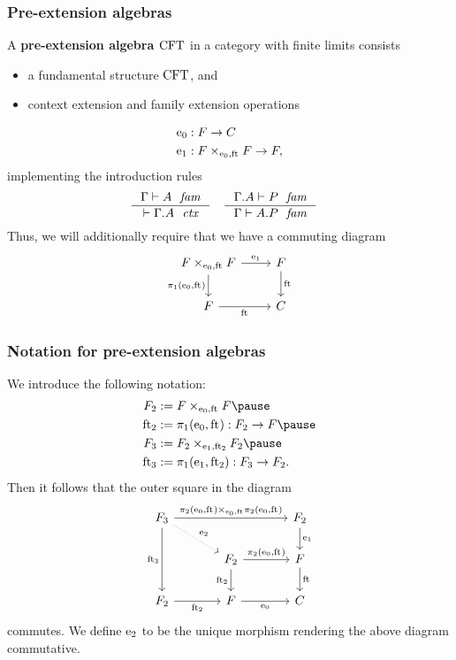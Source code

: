 \documentclass[handout]{beamer}
\newcommand\important[1]{\textbf{\color{red!90!black}#1}}
\begin{document}
\begin{frame}
\frametitle{\bf Pre-extension algebras}
A \important{pre-extension algebra $\mathrm{CFT}$} in a category with finite limits consists
\begin{itemize}
\item a fundamental structure $\mathrm{CFT}$, and
\item context extension and family extension operations
\end{itemize}
\begin{align*}
\ectxext%
  &%
: \stesysf \to \stesysc%
  \\
\efamext%
  &%
: \stesysff \to \stesysf,%
\end{align*}
implementing the introduction rules
\begin{align*}
& \inference
  { \jfam{\Gamma}{A}
    }
  { \jctx{\ctxext{\Gamma}{A}}
    }
& & \inference
  { \jfam{{\Gamma}{A}}{P}
    }
  { \jfam{\Gamma}{\ctxext{A}{P}}
    }
\end{align*}
Thus, we will additionally require that we have a commuting diagram
\begin{equation*}
\begin{tikzcd}[ampersand replacement=\&]
\stesysff 
  \ar{r}{\efamext} 
  \ar{d}[swap]{\pullbackpr{1}{\ectxext}{\eft}} 
  \& 
\stesysf 
  \ar{d}{\eft}
  \\
\stesysf
  \ar{r}[swap]{\eft} 
  \& 
\stesysc
\end{tikzcd}
\end{equation*}
\end{frame}

\begin{frame}
\frametitle{\bf Notation for pre-extension algebras}
We introduce the following notation:
\begin{align*}
\stesysf_2 
  & := \stesysff
  \pause
  \\
\eft[2] 
  & := \pullbackpr{1}{\ectxext}{\eft} : \stesysf_2\to\stesysf
  \pause
  \\
\stesysf_3 & := \pullback{\stesysf_2}{\stesysf_2}{\efamext}{\eft[2]}
  \pause
  \\
\eft[3]
  & := \pullbackpr{1}{\efamext}{\eft[2]} : \stesysf_3\to\stesysf_2.
\end{align*}
\pause
Then it follows that the outer square in the diagram
\begin{equation*}
\begin{tikzcd}[ampersand replacement=\&,column sep=large]
\stesysf_3
  \ar[dotted]{dr}{\eext{2}}
  \ar{rr}{\pullback{\pullbackpr{2}{\ectxext}{\eft}}{\pullbackpr{2}{\ectxext}{\eft}}{\ectxext}{\eft}}
  \ar{dd}[swap]{\eft[3]}
  \& 
  \&
\stesysf_2
  \ar{d}{\efamext}
  \\
  \&
\stesysf_2
  \ar{d}[swap]{\eft[2]}
  \ar{r}{\pullbackpr{2}{\ectxext}{\eft}}
  \&
\stesysf
  \ar{d}{\eft}
  \\
\stesysf_2
  \ar{r}[swap]{\eft[2]}
  \&
\stesysf
  \ar{r}[swap]{\ectxext}
  \&
\stesysc
\end{tikzcd}
\end{equation*}
commutes. \pause
We define \important{$\mathrm{e}_{2}$} to be the unique morphism rendering the above diagram
commutative. 
\end{frame}
\end{document}
